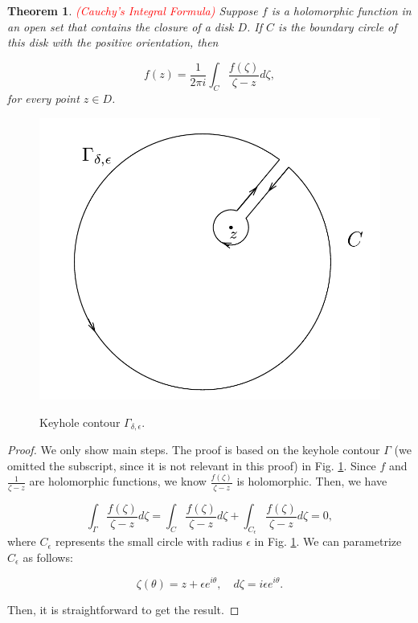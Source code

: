 \documentclass{article}
\newtheorem{theorem}{Theorem}
\begin{document}
\begin{theorem} \label{thm:cauchy_int} \textcolor{red}{(Cauchy's Integral Formula)}
Suppose $f$ is a holomorphic function in an open set that contains the closure of a disk $D$. If $C$ is the boundary circle of this disk with the positive orientation, then

\begin{equation*}
f(z)=\frac{1}{2\pi i}\int_C\frac{f(\zeta)}{\zeta-z}d\zeta,
\end{equation*}
for every point $z\in D$.
\end{theorem}

\begin{figure}
\centering
\includegraphics[scale=0.3]{keyhole.png} \\
\caption{Keyhole contour $\Gamma_{\delta,\epsilon}$.} 
\label{fig:keyhole_contour}
\end{figure}

\begin{proof}
We only show main steps. The proof is based on the keyhole contour $\Gamma$ (we omitted the subscript, since it is not relevant in this proof) in Fig. \ref{fig:keyhole_contour}. Since $f$ and $\frac{1}{\zeta-z}$ are holomorphic functions, we know $\frac{f(\zeta)}{\zeta-z}$ is holomorphic. Then, we have

\begin{equation*}
\int_\Gamma \frac{f(\zeta)}{\zeta-z}d\zeta=\int_C \frac{f(\zeta)}{\zeta-z}d\zeta + \int _{C_\epsilon} \frac{f(\zeta)}{\zeta-z}d\zeta=0,
\end{equation*}
where $C_\epsilon$ represents the small circle with radius $\epsilon$ in Fig. \ref{fig:keyhole_contour}. We can parametrize $C_\epsilon$ as follows:

\begin{equation*}
\zeta(\theta) = z+\epsilon e^{i\theta}, \quad d\zeta = i\epsilon e^{i\theta}.
\end{equation*}

Then, it is straightforward to get the result.

\end{proof}
\end{document}

